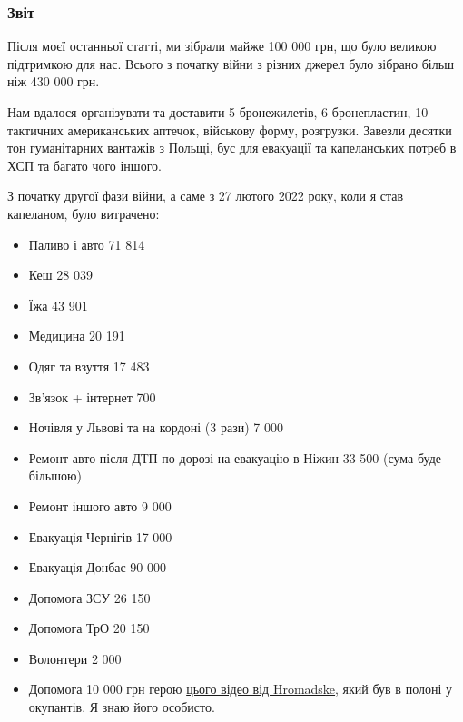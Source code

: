 
 
 
 
 

\subsubsection{Звіт}
\label{sec:25_04_2022.stz.pc.ua.dou.1.geroizm_pogljad_kapellana.6.zvit}

Після моєї останньої статті, ми зібрали майже 100 000 грн, що було великою
підтримкою для нас. Всього з початку війни з різних джерел було зібрано більш
ніж 430 000 грн.

Нам вдалося організувати та доставити 5 бронежилетів, 6 бронепластин, 10
тактичних американських аптечок, військову форму, розгрузки. Завезли десятки
тон гуманітарних вантажів з Польщі, бус для евакуації та капеланських потреб в
ХСП та багато чого іншого.

З початку другої фази війни, а саме з 27 лютого 2022 року, коли я став
капеланом, було витрачено:

\begin{itemize} %
\item Паливо і авто 71 814
\item Кеш 28 039
\item Їжа 43 901
\item Медицина 20 191
\item Одяг та взуття 17 483
\item Зв'язок + інтернет 700
\item Ночівля у Львові та на кордоні (3 рази) 7 000
\item Ремонт авто після ДТП по дорозі на евакуацію в Ніжин 33 500 (сума буде більшою)
\item Ремонт іншого авто 9 000
\item Евакуація Чернігів 17 000
\item Евакуація Донбас 90 000
\item Допомога ЗСУ 26 150
\item Допомога ТрО 20 150
\item Волонтери 2 000
\item Допомога 10 000 грн герою \href{https://youtu.be/HPqmJA3MbU0}{цього відео від Hromadske}, який був в полоні у окупантів. Я знаю його особисто.
\end{itemize} %

